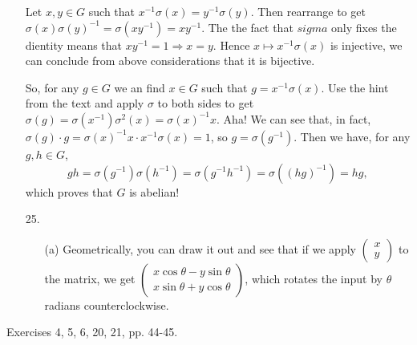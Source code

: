\documentclass[12pt]{article}
\theoremstyle{remark}
\theoremstyle{named}
\renewcommand{\implies}{\Rightarrow}
\begin{document}
\begin{enumerate}
    Let $x, y \in G$ such that $x^{-1}\sigma(x) = y^{-1}\sigma(y)$. Then rearrange to get \(\sigma(x)\sigma(y)^{-1} = \sigma(xy^{-1}) = xy^{-1}\). The the fact that \(sigma\) only fixes the dientity means that \(xy^{-1} = 1 \implies x = y\). Hence $x \mapsto x^{-1}\sigma(x)$ is injective, we can conclude from above considerations that it is bijective.
    
    So, for any \(g \in G\) we an find \(x \in G\) such that \(g = x^{-1} \sigma(x)\). Use the hint from the text and apply \(\sigma\) to both sides to get \(\sigma(g) = \sigma(x^{-1})\sigma^2(x) = \sigma(x)^{-1}x\). Aha! We can see that, in fact, \(\sigma(g) \cdot g = \sigma(x)^{-1} x \cdot x^{-1} \sigma(x) = 1\), so \(g = \sigma(g^{-1})\).
    Then we have, for any \(g, h \in G\), 
    \[gh = \sigma(g^{-1}) \sigma(h^{-1}) = \sigma(g^{-1}h^{-1}) = \sigma((hg)^{-1}) = hg,\]
    which proves that \(G\) is abelian!

    \item [25.] 
    \begin{enumerate}
        \item [(a)] Geometrically, you can draw it out and see that if we apply \(\begin{pmatrix}
            x \\
            y
        \end{pmatrix}\) to the matrix, we get \(\begin{pmatrix}
            x \cos \theta - y \sin \theta \\
            x \sin \theta + y \cos \theta
        \end{pmatrix}\), which rotates the input by \(\theta\) radians counterclockwise.
    \end{enumerate}
\end{enumerate}

Exercises 4, 5, 6, 20, 21, pp. 44-45.
\end{document}
